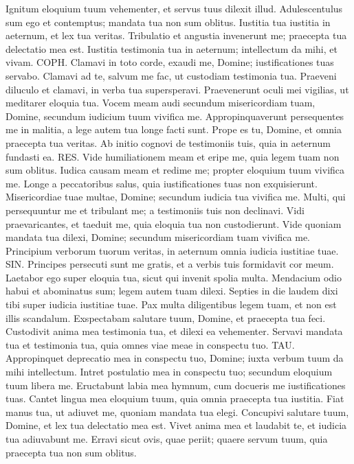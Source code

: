 \begin{biblechapter}
\verse Ignitum eloquium tuum vehementer, et servus tuus dilexit illud. 
\verse Adulescentulus sum ego et contemptus; mandata tua non sum oblitus. 
\verse Iustitia tua iustitia in aeternum, et lex tua veritas. 
\verse Tribulatio et angustia invenerunt me; praecepta tua delectatio mea est. 
\verse Iustitia testimonia tua in aeternum; intellectum da mihi, et vivam. 
\verse COPH. Clamavi in toto corde, exaudi me, Domine; iustificationes tuas servabo. 
\verse Clamavi ad te, salvum me fac, ut custodiam testimonia tua. 
\verse Praeveni diluculo et clamavi, in verba tua supersperavi. 
\verse Praevenerunt oculi mei vigilias, ut meditarer eloquia tua. 
\verse Vocem meam audi secundum misericordiam tuam, Domine, secundum iudicium tuum vivifica me. 
\verse Appropinquaverunt persequentes me in malitia, a lege autem tua longe facti sunt. 
\verse Prope es tu, Domine, et omnia praecepta tua veritas. 
\verse Ab initio cognovi de testimoniis tuis, quia in aeternum fundasti ea. 
\verse RES. Vide humiliationem meam et eripe me, quia legem tuam non sum oblitus. 
\verse Iudica causam meam et redime me; propter eloquium tuum vivifica me. 
\verse Longe a peccatoribus salus, quia iustificationes tuas non exquisierunt. 
\verse Misericordiae tuae multae, Domine; secundum iudicia tua vivifica me. 
\verse Multi, qui persequuntur me et tribulant me; a testimoniis tuis non declinavi. 
\verse Vidi praevaricantes, et taeduit me, quia eloquia tua non custodierunt. 
\verse Vide quoniam mandata tua dilexi, Domine; secundum misericordiam tuam vivifica me. 
\verse Principium verborum tuorum veritas, in aeternum omnia iudicia iustitiae tuae. 
\verse SIN. Principes persecuti sunt me gratis, et a verbis tuis formidavit cor meum. 
\verse Laetabor ego super eloquia tua, sicut qui invenit spolia multa. 
\verse Mendacium odio habui et abominatus sum; legem autem tuam dilexi. 
\verse Septies in die laudem dixi tibi super iudicia iustitiae tuae. 
\verse Pax multa diligentibus legem tuam, et non est illis scandalum. 
\verse Exspectabam salutare tuum, Domine, et praecepta tua feci. 
\verse Custodivit anima mea testimonia tua, et dilexi ea vehementer. 
\verse Servavi mandata tua et testimonia tua, quia omnes viae meae in conspectu tuo. 
\verse TAU. Appropinquet deprecatio mea in conspectu tuo, Domine; iuxta verbum tuum da mihi intellectum. 
\verse Intret postulatio mea in conspectu tuo; secundum eloquium tuum libera me. 
\verse Eructabunt labia mea hymnum, cum docueris me iustificationes tuas. 
\verse Cantet lingua mea eloquium tuum, quia omnia praecepta tua iustitia. 
\verse Fiat manus tua, ut adiuvet me, quoniam mandata tua elegi. 
\verse Concupivi salutare tuum, Domine, et lex tua delectatio mea est. 
\verse Vivet anima mea et laudabit te, et iudicia tua adiuvabunt me. 
\verse Erravi sicut ovis, quae periit; quaere servum tuum, quia praecepta tua non sum oblitus. 
\end{biblechapter}


